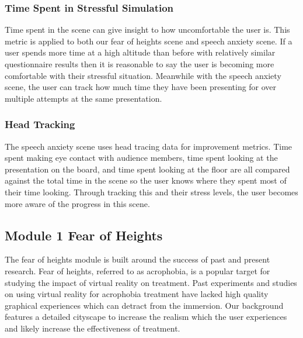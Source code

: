 \documentclass[a4paper,10pt]{article}
\begin{document}
\subsubsection{Time Spent in Stressful Simulation}
Time spent in the scene can give insight to how uncomfortable the user is. This metric is applied to both our fear of heights scene and speech anxiety scene. If a user spends more time at a high altitude than before with relatively similar questionnaire results then it is reasonable to say the user is becoming more comfortable with their stressful situation. Meanwhile with the speech anxiety scene, the user can track how much time they have been presenting for over multiple attempts at the same presentation. 

\subsubsection{Head Tracking}
The speech anxiety scene uses head tracing data for improvement metrics.  Time spent making eye contact with audience members, time spent looking at the presentation on the board, and time spent looking at the floor are all compared against the total time in the scene so the user knows where they spent most of their time looking.  Through tracking this and their stress levels, the user becomes more aware of the progress in this scene.

\pagebreak
\subsection{Module 1 Fear of Heights}
The fear of heights module is built around the success of past and present research. Fear of heights, referred to as acrophobia, is a popular target for studying the impact of virtual reality on treatment. Past experiments and studies on using virtual reality for acrophobia treatment have lacked high quality graphical experiences which can detract from the immersion. Our background features a detailed cityscape to increase the realism which the user experiences and likely increase the effectiveness of treatment.
\end{document}
